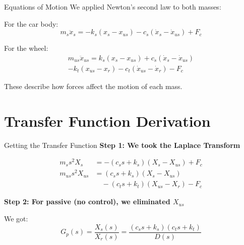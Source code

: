 \documentclass[aspectratio=169]{beamer}
\begin{document}
\begin{frame}{Equations of Motion}
  We applied Newton's second law to both masses:
  
  \begin{block}{For the car body:}
    \vspace{-0.2cm}
    \begin{equation}
      m_s \ddot{x}_s = -k_s(x_s - x_{us}) - c_s(\dot{x}_s - \dot{x}_{us}) + F_c
    \end{equation}
  \end{block}
  
  \begin{block}{For the wheel:}
    \vspace{-0.2cm}
    \begin{equation}
      \begin{split}
      m_{us} \ddot{x}_{us} = k_s(x_s - x_{us}) + c_s(\dot{x}_s - \dot{x}_{us}) \\
      - k_t(x_{us} - x_r) - c_t(\dot{x}_{us} - \dot{x}_r) - F_c
      \end{split}
    \end{equation}
  \end{block}
  
  These describe how forces affect the motion of each mass.
\end{frame}

\section{Transfer Function Derivation}

\begin{frame}{Getting the Transfer Function}
  \textbf{Step 1: We took the Laplace Transform}
  
  \small
  \begin{align}
    m_s s^2 X_s &= -(c_s s + k_s)(X_s - X_{us}) + F_c \\
    m_{us} s^2 X_{us} &= (c_s s + k_s)(X_s - X_{us}) \nonumber \\
    &\quad - (c_t s + k_t)(X_{us} - X_r) - F_c
  \end{align}
  
  \normalsize
  \vspace{0.3cm}
  
  \textbf{Step 2: For passive (no control), we eliminated $X_{us}$}
  
  \begin{block}{We got:}
    \vspace{-0.2cm}
    \begin{equation}
      G_p(s) = \frac{X_s(s)}{X_r(s)} = \frac{(c_s s + k_s)(c_t s + k_t)}{D(s)}
    \end{equation}
  \end{block}
\end{frame}
\end{document}
